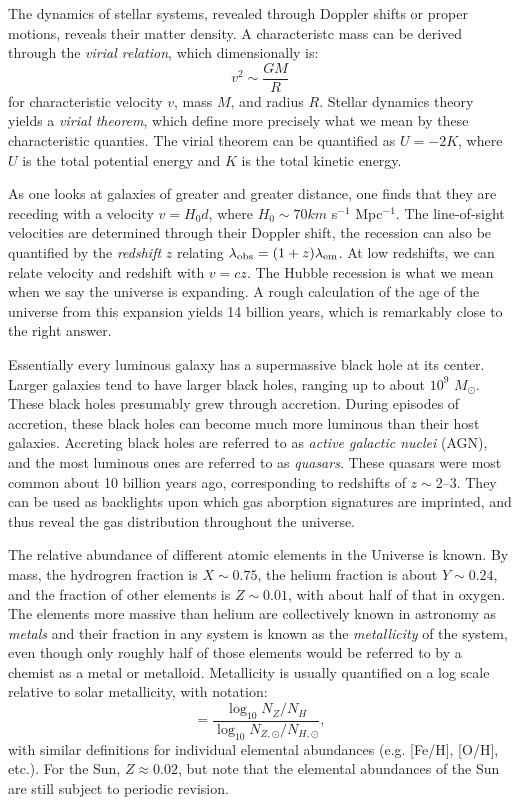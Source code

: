 The dynamics of stellar systems, revealed through Doppler shifts or
proper motions, reveals their matter density. A characteristc mass can
be derived through the {\it virial relation}, which dimensionally is:
\begin{equation}
v^2 \sim \frac{GM}{R}
\end{equation}
for characteristic velocity $v$, mass $M$, and radius $R$. Stellar
dynamics theory yields a {\it virial theorem}, which define more
precisely what we mean by these characteristic quanties. The virial
theorem can be quantified as $U = -2 K$, where $U$ is the total
potential energy and $K$ is the total kinetic energy.

As one looks at galaxies of greater and greater distance, one finds
that they are receding with a velocity $v= H_0d$, where $H_0 \sim 70
km$ s$^{-1}$ Mpc$^{-1}$. The line-of-sight velocities are determined
through their Doppler shift, the recession can also be quantified by
the {\it redshift} $z$ relating $\lambda_{\rm obs} = (1+z)
\lambda_{\rm em}$. At low redshifts, we can relate velocity and
redshift with $v=cz$. The Hubble recession is what we mean when we say
the universe is expanding. A rough calculation of the age of the
universe from this expansion yields 14 billion years, which is
remarkably close to the right answer.

Essentially every luminous galaxy has a supermassive black hole at its
center. Larger galaxies tend to have larger black holes, ranging up to
about $10^9$ $M_\odot$. These black holes presumably grew through
accretion. During episodes of accretion, these black holes can become
much more luminous than their host galaxies. Accreting black holes are
referred to as {\it active galactic nuclei} (AGN), and the most
luminous ones are referred to as {\it quasars}. These quasars were
most common about 10 billion years ago, corresponding to redshifts of
$z\sim 2$--$3$. They can be used as backlights upon which gas
aborption signatures are imprinted, and thus reveal the gas
distribution throughout the universe.

The relative abundance of different atomic elements in the Universe is
known. By mass, the hydrogren fraction is $X \sim 0.75$, the helium
fraction is about $Y \sim 0.24$, and the fraction of other elements is
$Z \sim 0.01$, with about half of that in oxygen. The elements more
massive than helium are collectively known in astronomy as {\it
metals} and their fraction in any system is known as the {\it
metallicity} of the system, even though only roughly half of those
elements would be referred to by a chemist as a metal or
metalloid. Metallicity is usually quantified on a log scale relative
to solar metallicity, with notation:
\begin{equation}
[Z/H] = \frac{\log_{10} N_Z / N_H}{\log_{10} N_{Z, \odot} /
N_{H, \odot}}, 
\end{equation}
with similar definitions for individual elemental abundances
(e.g. [Fe/H], [O/H], etc.). For the Sun, $Z\approx 0.02$, but note
that the elemental abundances of the Sun are still subject to periodic
revision.


